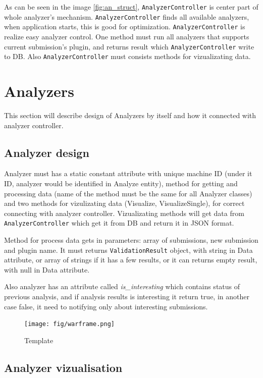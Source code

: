 As can be seen in the image \ref{fig:an_struct}, \texttt{AnalyzerController} is center part of whole analyzer's mechanism. \texttt{AnalyzerController} finds all available analyzers, when application starts, this is good for optimization. \texttt{AnalyzerController} is realize easy analyzer control. One method must run all analyzers that supports current submission's plugin, and returns result which \texttt{AnalyzerController} write to DB. Also \texttt{AnalyzerController} must consists methods for vizualizating data.

\section{Analyzers}

This section will describe design of Analyzers by itself and how it connected with analyzer controller.

\subsection{Analyzer design}

Analyzer must has a static constant attribute with unique machine ID (under it ID, analyzer would be identified in Analyze entity), method for getting and processing data (name of the method must be the same for all Analyzer classes) and two methods for vizulizating data (Visualize, VisualizeSingle), for correct connecting with analyzer controller. Vizualizating methods will get data from \texttt{AnalyzerController} which get it from DB and return it in JSON format.

Method for process data gets in parameters: array of submissions, new submission and plugin name. It must returns \texttt{ValidationResult} object, with string in Data attribute, or array of strings if it has a few results, or it can returns empty result, with null in Data attribute.

Also analyzer has an attribute called \emph{is\_interesting} which contains status of previous analysis, and if analysis results is interesting it return true, in another case false, it need to notifying only about interesting submissions.

\begin{figure}
  \centering
    \texttt{[image: fig/warframe.png]}
  \caption{Template}
  \label{fig:temp}
\end{figure}

\subsection{Analyzer vizualisation}

